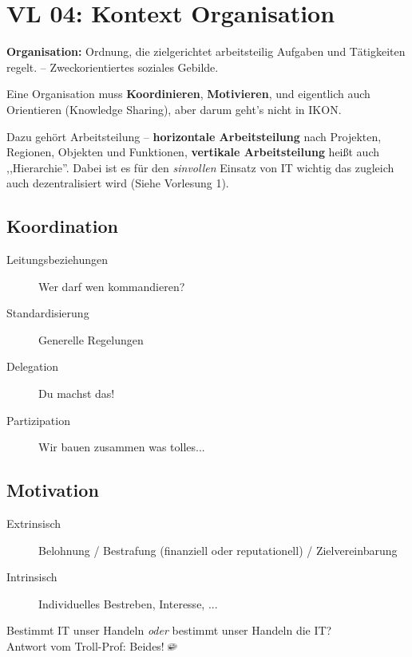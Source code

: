 \section{VL 04: Kontext Organisation}

\textbf{Organisation:} Ordnung, die zielgerichtet arbeitsteilig Aufgaben und
Tätigkeiten regelt. -- Zweckorientiertes soziales Gebilde.

Eine Organisation muss \textbf{Koordinieren}, \textbf{Motivieren}, und eigentlich auch
Orientieren (Knowledge Sharing), aber darum geht's nicht in IKON.

Dazu gehört Arbeitsteilung -- \textbf{horizontale Arbeitsteilung} nach Projekten, Regionen, Objekten und Funktionen,
\textbf{vertikale Arbeitsteilung} heißt auch ,,Hierarchie''. Dabei ist es für den \emph{sinvollen} Einsatz von IT wichtig das zugleich auch dezentralisiert wird (Siehe Vorlesung 1).

\subsection{Koordination}

\begin{description}
    \item[Leitungsbeziehungen] Wer darf wen kommandieren?
    \item[Standardisierung] Generelle Regelungen
    \item[Delegation] Du machst das!
    \item[Partizipation] Wir bauen zusammen was tolles...
\end{description}

\subsection{Motivation}

\begin{description}
    \item[Extrinsisch] Belohnung / Bestrafung (finanziell oder reputationell) / Zielvereinbarung
    \item[Intrinsisch] Individuelles Bestreben, Interesse, ...
\end{description}

\begin{center}{\large Bestimmt IT unser Handeln \emph{oder} bestimmt unser Handeln die IT?}\\
{\footnotesize Antwort vom Troll-Prof: Beides! \includegraphics[width=0.3cm]{wichtige-anmerkung.png}}\end{center}


